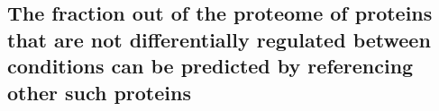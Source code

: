 \subsection{The fraction out of the proteome of proteins that are not differentially regulated between conditions can be predicted by referencing other such proteins}